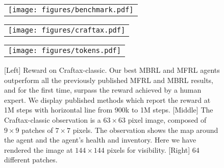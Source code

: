 \begin{figure}[t!]
    \centering
    \begin{tabular}{c}
    \texttt{[image: figures/benchmark.pdf]}
    \end{tabular}
    \hspace{-.5em}
    \begin{tabular}{c}
        \texttt{[image: figures/craftax.pdf]} 
    \end{tabular}
    \hspace{-1em}
    \begin{tabular}{c}
        \texttt{[image: figures/tokens.pdf]}
    \end{tabular}
    \vspace{-.75em}
    \caption{
    [Left]
    Reward on Craftax-classic.
    Our best MBRL and MFRL agents outperform all the previously published MFRL and MBRL results, and for the first time, surpass the reward achieved by a human expert.
    We display published methods which report the reward at 1M steps with horizontal line from 900k to 1M steps. 
    [Middle] The Craftax-classic observation is a $63 \times 63$ pixel image, composed of $9\times9$ patches of $7\times7$ pixels. 
    The observation shows the map around the agent and the agent's health and inventory. Here we have rendered the image at $144 \times 144$ pixels for visibility. 
    [Right] $64$ different patches.
    }
    \label{fig:teaser}
\vspace{-1.em}
\end{figure}



